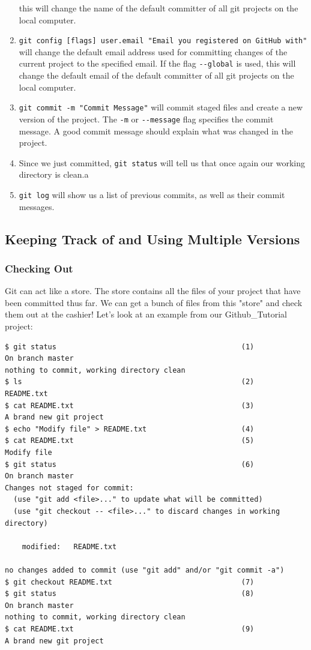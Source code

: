 \documentclass[11pt,fleqn]{article}
\theoremstyle{definition}
\begin{document}
\begin{enumerate}
    this will change the name of the default committer of all git projects on
    the local computer.
\item \verb|git config [flags] user.email "Email you registered on GitHub with"|
    will change the default email address used for committing changes of the
    current project to the specified email. If the flag \verb|--global| is used,
    this will change the default email of the default committer of all git
    projects on the local computer.
\item \verb|git commit -m "Commit Message"| will commit staged files and create
    a new version of the project. The \verb|-m| or \verb|--message| flag
    specifies the commit message. A good commit message should explain what was
    changed in the project.
\item Since we just committed, \verb|git status| will tell us that once again
    our working directory is clean.a
\item \verb|git log| will show us a list of previous commits, as well as their
    commit messages.
\end{enumerate}

\newpage
\subsection{Keeping Track of and Using Multiple Versions}

\subsubsection{Checking Out}
Git can act like a store. The store contains all the files of your project that
have been committed thus far. We can get a bunch of files from this "store" and
check them out at the cashier! Let's look at an example from our
Github\_Tutorial project:

\begin{verbatim}
$ git status                                           (1)
On branch master
nothing to commit, working directory clean
$ ls                                                   (2)
README.txt
$ cat README.txt                                       (3)
A brand new git project
$ echo "Modify file" > README.txt                      (4)
$ cat README.txt                                       (5)
Modify file
$ git status                                           (6)
On branch master
Changes not staged for commit:
  (use "git add <file>..." to update what will be committed)
  (use "git checkout -- <file>..." to discard changes in working directory)

	modified:   README.txt

no changes added to commit (use "git add" and/or "git commit -a")
$ git checkout README.txt                              (7)
$ git status                                           (8)
On branch master
nothing to commit, working directory clean
$ cat README.txt                                       (9)
A brand new git project
\end{verbatim}
\end{document}
